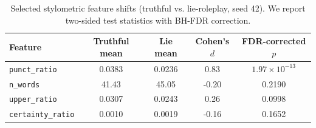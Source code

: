 \begin{table}[t]
\centering
\caption{Selected stylometric feature shifts (truthful vs.
lie-roleplay, seed 42). We report two-sided test statistics with BH-FDR correction.}
\label{tab:feature-shift}
\begin{tabular}{@{}lcccc@{}}
\toprule
Feature & Truthful mean & Lie mean & Cohen's $d$ & FDR-corrected $p$ \\
\midrule
\texttt{punct\_ratio} & 0.0383 & 0.0236 & 0.83 & $1.97\times10^{-13}$ \\
\texttt{n\_words} & 41.43 & 45.05 & -0.20 & 0.2190 \\
\texttt{upper\_ratio} & 0.0307 & 0.0243 & 0.26 & 0.0998 \\
\texttt{certainty\_ratio} & 0.0010 & 0.0019 & -0.16 & 0.1652 \\
\bottomrule
\end{tabular}
\end{table}
